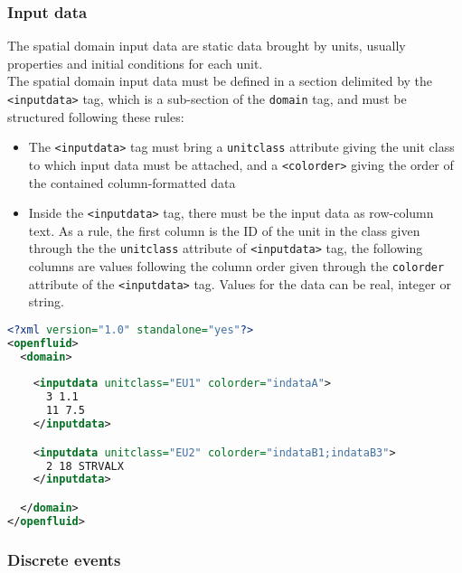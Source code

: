 \subsubsection{Input data}

The spatial domain input data are static data brought by units, usually properties and initial conditions for each unit.\\
\noindent The spatial domain input data must be defined in a section delimited
by the \texttt{<inputdata>} tag, which is a sub-section of the \texttt{domain}
tag, and must be structured following these rules:
\begin{itemize}
  \item The \texttt{<inputdata>} tag must bring a \texttt{unitclass}
  attribute giving the unit class to which input data must be attached, and a
  \texttt{<colorder>} giving the order of the contained column-formatted data
  \item Inside the \texttt{<inputdata>} tag, there must be the input data as 
  row-column text. As a rule, the first column is the ID of the unit in the class
  given through the the \texttt{unitclass} attribute of \texttt{<inputdata>}
  tag, the following columns are values following the column order given
  through the \texttt{colorder} attribute of the \texttt{<inputdata>} tag.
  Values for the data can be real, integer or string.
\end{itemize}

\bigskip

\begin{lstlisting}[language=xml,title=\footnotesize\textit{example}]
<?xml version="1.0" standalone="yes"?>
<openfluid>
  <domain>
  
    <inputdata unitclass="EU1" colorder="indataA">
      3 1.1
      11 7.5
    </inputdata>

    <inputdata unitclass="EU2" colorder="indataB1;indataB3">
      2 18 STRVALX
    </inputdata>

  </domain>
</openfluid>
\end{lstlisting}


\bigskip



\bigskip

\subsubsection{Discrete events}

